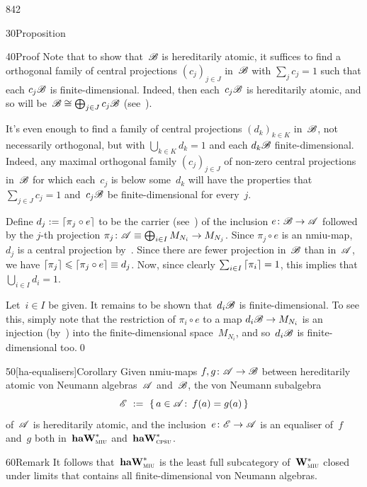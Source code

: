 \begin{parsec}{842}
\begin{point}{30}{Proposition}
\begin{point}{40}{Proof}
Note that to show that~$\mathscr{B}$ is hereditarily atomic,
it suffices to find a orthogonal family of central
projections $(c_j)_{j\in J}$ in~$\mathscr{B}$
with $\sum_j c_j=1$ 
such that  each $c_j\mathscr{B}$ is finite-dimensional.
Indeed, then each~$c_j\mathscr{B}$ is hereditarily atomic,
and so will be~$\mathscr{B}\cong \bigoplus_{j\in J} c_j\mathscr{B}$
(see~).

It's even enough to find a family of central projections
$(d_k)_{k\in K}$ in~$\mathscr{B}$,
not necessarily orthogonal, but
with $\bigcup_{k\in K} d_k =1$
and each $d_k\mathscr{B}$  finite-dimensional.
Indeed, any maximal orthogonal 
family $(c_j)_{j\in J}$
of non-zero central projections in~$\mathscr{B}$
for which each~$c_j$ is below some~$d_k$
will have the properties
that $\sum_{j\in J} c_j =1$
and~$c_j\mathscr{B}$ be finite-dimensional for every~$j$.

Define $d_j := \left\lceil\pi_j\circ e\right\rceil$
to be the carrier (see~)
of the inclusion $e\colon \mathscr{B}\to\mathscr{A}$
followed by the $j$-th projection
$\pi_j\colon \mathscr{A}\equiv\bigoplus_{i\in I}M_{N_i}\to M_{N_j}$.
Since $\pi_j\circ e$ is an nmiu-map,
    $d_j$ is a central projection by~.
Since there are fewer projection in~$\mathscr{B}$ than in~$\mathscr{A}$,
we have $\left\lceil\pi_j\right\rceil\leqslant \left\lceil\pi_j\circ e\right\rceil\equiv d_j$.
Now, since clearly $\sum_{i\in I}\left\lceil\pi_i\right\rceil=1$,
this implies that $\bigcup_{i\in I} d_i =1$.

Let~$i\in I$ be given.
It remains to be shown that~$d_i\mathscr{B}$ is finite-dimensional.
To see this, simply note that the restriction
of $\pi_i\circ e$ to a map $d_i\mathscr{B} \to M_{N_i}$
    is an injection (by~)
    into the finite-dimensional space~$M_{N_i}$,
    and so~$d_i\mathscr{B}$ is finite-dimensional too.\qed
\end{point}
\end{point}
\begin{point}{50}[ha-equalisers]{Corollary}%
Given nmiu-maps
$f,g\colon \mathscr{A}\to\mathscr{B}$
between hereditarily atomic
von Neumann algebras~$\mathscr{A}$ and~$\mathscr{B}$,
the von Neumann subalgebra
\begin{equation*}
    \mathscr{E} \ :=\  \{\,a\in\mathscr{A}\colon\, f(a)=g(a)\,\}
\end{equation*}
of~$\mathscr{A}$
is hereditarily atomic,
and the inclusion~$e\colon \mathscr{E}\to\mathscr{A}$
is an equaliser of~$f$ and~$g$ both in~$\mathbf{haW}^*_{\text{\textsc{miu}}}$
and~$\mathbf{haW}^*_{\text{\textsc{cpsu}}}$.
\end{point}
\begin{point}{60}{Remark}%
It follows that~$\mathbf{haW}^*_{\text{\textsc{miu}}}$
is the least full subcategory of~$\mathbf{W}^*_{\text{\textsc{miu}}}$
closed under limits
that contains all finite-dimensional von Neumann algebras.
\end{point}
\end{parsec}

